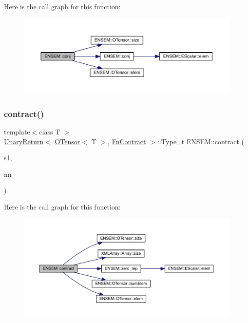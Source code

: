 Here is the call graph for this function\+:\nopagebreak
\begin{figure}[H]
\begin{center}
\leavevmode
\includegraphics[width=350pt]{de/d87/group__obstensor_ga53d2641f95a433640eadd4ab33fed1ba_cgraph}
\end{center}
\end{figure}
\mbox{\label{group__obstensor_ga2c9ce6b1bd52f861eb3ec96cee9d6334}} 
\subsubsection{\texorpdfstring{contract()}{contract()}}
{\footnotesize\ttfamily template$<$class T $>$ \\
\mbox{\hyperlink{structENSEM_1_1UnaryReturn}{Unary\+Return}}$<$ \mbox{\hyperlink{classENSEM_1_1OTensor}{O\+Tensor}}$<$ T $>$, \mbox{\hyperlink{structENSEM_1_1FnContract}{Fn\+Contract}} $>$\+::Type\+\_\+t E\+N\+S\+E\+M\+::contract (\begin{DoxyParamCaption}\item[{const \mbox{\hyperlink{classENSEM_1_1OTensor}{O\+Tensor}}$<$ T $>$ \&}]{s1,  }\item[{const \mbox{\hyperlink{classXMLArray_1_1Array}{Array}}$<$ int $>$ \&}]{nn }\end{DoxyParamCaption})\hspace{0.3cm}{\ttfamily [inline]}}

Here is the call graph for this function\+:\nopagebreak
\begin{figure}[H]
\begin{center}
\leavevmode
\includegraphics[width=350pt]{de/d87/group__obstensor_ga2c9ce6b1bd52f861eb3ec96cee9d6334_cgraph}
\end{center}
\end{figure}
\mbox{\label{group__obstensor_gaec447bbfae019c25fe1906a76108bff8}} 
